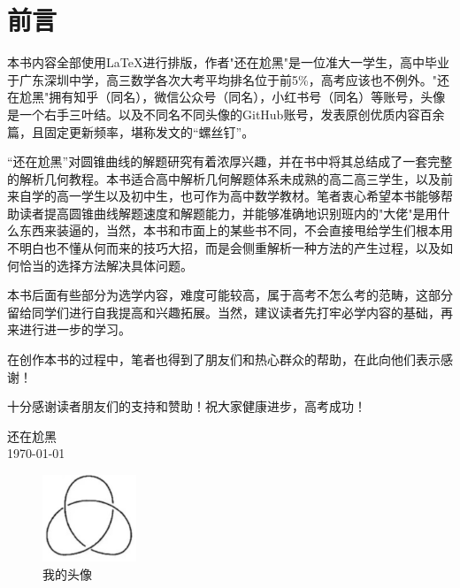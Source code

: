 \documentclass[12pt,fontset=windows, a4paper, oneside,UTF8]{ctexbook}
\begin{document}

\frontmatter
\pagestyle{frontmatter} %
\chapter*{前言}
本书内容全部使用\LaTeX{}进行排版，作者"还在尬黑"是一位准大一学生，高中毕业于广东深圳中学，高三数学各次大考平均排名位于前5\%，高考应该也不例外。"还在尬黑"拥有知乎（同名），微信公众号（同名），小红书号（同名）等账号，头像是一个右手三叶结。以及不同名不同头像的GitHub账号，发表原创优质内容百余篇，且固定更新频率，堪称发文的“螺丝钉”。

“还在尬黑”对圆锥曲线的解题研究有着浓厚兴趣，并在书中将其总结成了一套完整的解析几何教程。本书适合高中解析几何解题体系未成熟的高二高三学生，以及前来自学的高一学生以及初中生，也可作为高中数学教材。笔者衷心希望本书能够帮助读者提高圆锥曲线解题速度和解题能力，并能够准确地识别班内的"大佬"是用什么东西来装逼的，当然，本书和市面上的某些书不同，不会直接甩给学生们根本用不明白也不懂从何而来的技巧大招，而是会侧重解析一种方法的产生过程，以及如何恰当的选择方法解决具体问题。

本书后面有些部分为选学内容，难度可能较高，属于高考不怎么考的范畴，这部分留给同学们进行自我提高和兴趣拓展。当然，建议读者先打牢必学内容的基础，再来进行进一步的学习。

在创作本书的过程中，笔者也得到了朋友们和热心群众的帮助，在此向他们表示感谢！

十分感谢读者朋友们的支持和赞助！祝大家健康进步，高考成功！
\begin{flushright}
    \vspace{2\baselineskip} %
    \kt 还在尬黑 \\ %
    \today
\end{flushright}
\begin{figure}[htbp]
	\centering
    \includegraphics[width=0.25\textwidth]{flg/logo.png}%
	\caption{我的头像}
	\label{fig0-1}
\end{figure}

\newpage
\CTEXoptions[tocdepth=2] %
\tableofcontents
\thispagestyle{tocmatter} 
\mainmatter
\pagestyle{mainmatter} %



\end{document}
